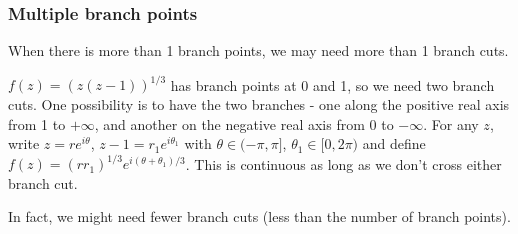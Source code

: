 \documentclass[a4paper]{article}
\begin{document}
\subsubsection{Multiple branch points}
When there is more than 1 branch points, we may need more than 1 branch cuts.
\begin{eg}
$f(z)=(z(z-1))^{1/3}$ has branch points at 0 and 1, so we need two branch cuts. One possibility is to have the two branches - one along the positive real axis from 1 to $+\infty$, and another on the negative real axis from 0 to $-\infty$. For any $z$, write $z=re^{i\theta}$, $z-1=r_1e^{i\theta_1}$ with $\theta\in(-\pi,\pi]$, $\theta_1\in[0,2\pi)$ and define $f(z)=(rr_1)^{1/3}e^{i(\theta+\theta_1)/3}$. This is continuous as long as we don't cross either branch cut.
\begin{center}
\end{center}
\end{eg}
In fact, we might need fewer branch cuts (less than the number of branch points).
\end{document}
